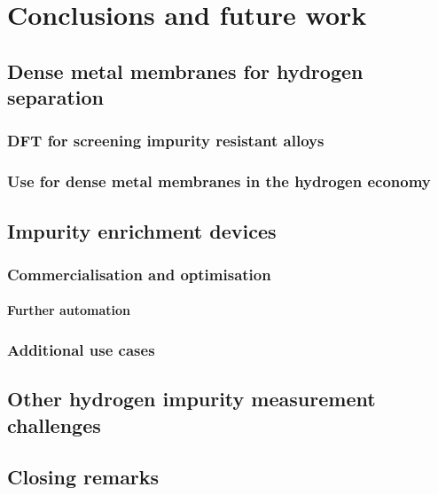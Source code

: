 \chapter{Conclusions and future work}

\section{Dense metal membranes for hydrogen separation}
\subsection{DFT for screening impurity resistant alloys}
\subsection{Use for dense metal membranes in the hydrogen economy}
\section{Impurity enrichment devices}
\subsection{Commercialisation and optimisation}
\subsubsection{Further automation}
\subsection{Additional use cases}

\section{Other hydrogen impurity measurement challenges}

\section{Closing remarks}



% 
% 